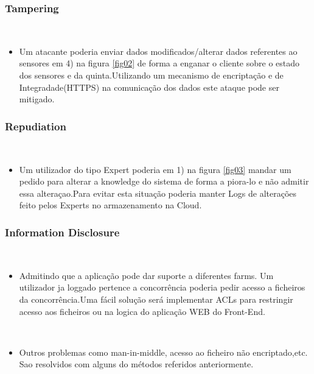 \subsubsection{Tampering}
\hfill\\
\begin{itemize}

\item Um atacante poderia enviar dados modificados/alterar dados referentes ao sensores em 4) na figura \ref{fig02} de forma a enganar o cliente sobre o estado dos sensores e da quinta.Utilizando um mecanismo de encriptação e de Integradade(HTTPS) na comunicação dos dados este ataque pode ser mitigado.

\end{itemize}

\subsubsection{Repudiation}
\hfill\\
\begin{itemize}

\item Um utilizador do tipo Expert poderia em 1) na figura \ref{fig03} mandar um pedido para alterar a knowledge do sistema de forma a piora-lo e não admitir essa alteraçao.Para evitar esta situação poderia manter Logs de alterações feito pelos Experts no armazenamento na Cloud.

\end{itemize}

\subsubsection{Information Disclosure}
\hfill\\
\begin{itemize}
\item Admitindo que a aplicação pode dar suporte a diferentes farms. Um utilizador ja loggado pertence a concorrência poderia pedir acesso a ficheiros da concorrência.Uma fácil solução será implementar ACLs para restringir acesso aos ficheiros ou na logica do aplicação WEB do Front-End.

\hfill\\

\item Outros problemas como man-in-middle, acesso ao ficheiro não encriptado,etc. Sao resolvidos com alguns do métodos referidos anteriormente.
\end{itemize}

